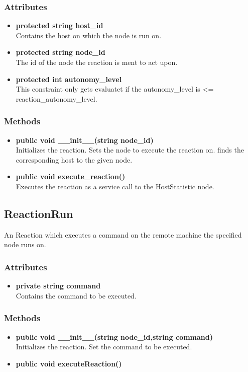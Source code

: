 \subsubsection{Attributes}
\begin{itemize}
	\item \textbf{ protected string host\_id }\\
		Contains the host on which the node is run on.
	\item \textbf{ protected string node\_id }\\
		The id of the node the reaction is ment to act upon.
	\item \textbf{ protected int autonomy\_level }\\
		This constraint only gets evaluatet if 
		the autonomy\_level is <= reaction\_autonomy\_level.
\end{itemize}
\subsubsection{Methods}
\begin{itemize}
	\item \textbf{ public void \_\_init\_\_(string node\_id) }\\
		Initializes the reaction. Sets the node to execute the reaction on. finds the corresponding host to the given node.
	\item \textbf{ public void execute\_reaction() }\\
		Executes the reaction as a service call to the HostStatistic node.
\end{itemize}


\subsection{ReactionRun}
	An Reaction which executes a command on the remote machine the specified node runs on. 
\subsubsection{Attributes}
\begin{itemize}
	\item \textbf{ private string command }\\
	Contains the command to be executed.
\end{itemize}
\subsubsection{Methods}
\begin{itemize}
	\item \textbf{ public void \_\_init\_\_(string node\_id,string command) }\\
		Initializes the reaction. Set the command to be executed.
	\item \textbf{ public void executeReaction() }\\
\end{itemize}


